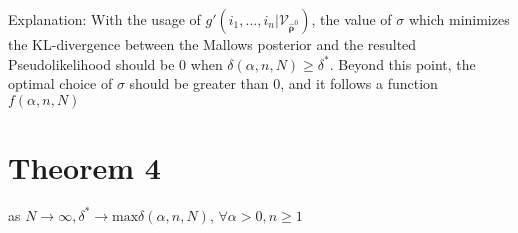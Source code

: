 \documentclass[11pt, oneside]{article}   	%
\begin{document}
Explanation: With the usage of $g'(i_1, ...,i_n|\mathcal{V}_{\hat{\bm{\rho}}^0})$, the value of $\sigma$ which minimizes the KL-divergence between the Mallows posterior and the resulted Pseudolikelihood should be 0 when $\delta(\alpha,n,N) \geq \delta^*$. Beyond this point, the optimal choice of $\sigma$ should be greater than 0, and it follows a function $f(\alpha,n,N)$

\section{Theorem 4}
as $N \rightarrow \infty,\delta^{*} \rightarrow \text{max}\delta(\alpha,n,N) $, $\forall \alpha >0, n\geq 1$
\end{document}
